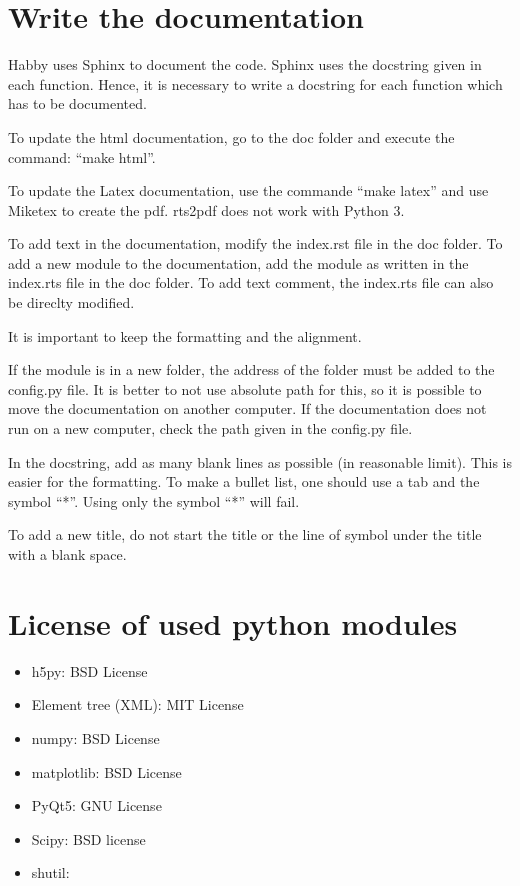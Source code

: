 \documentclass[letterpaper,10pt,english]{sphinxmanual}
\begin{document}
\section{Write the documentation}
\label{\detokenize{index:write-the-documentation}}
Habby uses Sphinx to document the code. Sphinx uses the docstring given in each function. Hence, it is necessary to write a docstring for each function which has to be documented.

To update the html documentation, go to the doc folder and execute the command: “make html”.

To update the Latex documentation, use the commande ``make latex'' and use Miketex to create the pdf. rts2pdf does not work with Python 3.

To add text in the documentation, modify the index.rst file in the doc folder. To add a new module to the
documentation, add the module as written in the index.rts file in the doc folder. To add text comment, the index.rts file can also be direclty modified.

It is important to keep the formatting and the alignment.

If the module is in a new folder, the address of the folder must be added to the config.py file.
It is better to not use absolute path for this, so it is possible to move the documentation on another
computer. If the documentation does not run on a new computer, check the path given in the config.py file.

In the docstring, add as many blank lines as possible (in reasonable limit). This is easier for the
formatting. To make a bullet list, one should use a tab and the symbol ``*''.  Using only the symbol ``*'' will
fail.

To add a new title, do not start the title or the line of symbol under the title with a blank space.


\section{License of used python modules}
\label{\detokenize{index:license-of-used-python-modules}}\begin{itemize}
\item {} 
h5py: BSD License

\item {} 
Element tree (XML): MIT License

\item {} 
numpy: BSD License

\item {} 
matplotlib: BSD License

\item {} 
PyQt5: GNU License

\item {} 
Scipy: BSD license

\item {} 
shutil:

\end{itemize}
\end{document}
